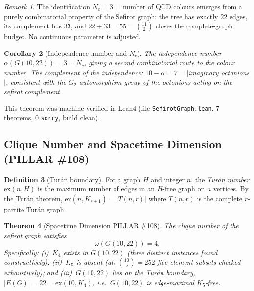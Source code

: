 \documentclass[aps,prd,twocolumn,superscriptaddress,floatfix,nofootinbib]{revtex4-2}
\newtheorem{theorem}{Theorem}
\newtheorem{corollary}[theorem]{Corollary}
\theoremstyle{definition}
\newtheorem{definition}[theorem]{Definition}
\theoremstyle{remark}
\newtheorem{remark}[theorem]{Remark}
\newcommand{\ie}{\textit{i.e.}}
\begin{document}
\begin{remark}
The identification $N_c=3$ = number of QCD colours emerges from a purely
combinatorial property of the Sefirot graph: the tree has exactly $22$ edges,
its complement has $33$, and $22+33=55=\binom{11}{2}$ closes the
complete-graph budget.  No continuous parameter is adjusted.
\end{remark}

\begin{corollary}[Independence number and $N_c$]
\label{cor:independence}
The independence number $\alpha(G(10,22))=3 = N_c$, giving a second
combinatorial route to the colour number.
The complement of the independence: $10 - \alpha = 7 = |$imaginary octonions$|$,
consistent with the $G_2$ automorphism group of the octonions acting on the
sefirot complement.
\end{corollary}

This theorem was machine-verified in Lean4 (file \texttt{SefirotGraph.lean},
7 theorems, 0 \texttt{sorry}, build clean).

\subsection{Clique Number and Spacetime Dimension (PILLAR \#108)}
\label{subsec:clique-spacetime}

\begin{definition}[Tur\'{a}n boundary]
For a graph $H$ and integer $n$, the \emph{Tur\'{a}n number} $\mathrm{ex}(n,H)$
is the maximum number of edges in an $H$-free graph on $n$ vertices.
By the Tur\'{a}n theorem, $\mathrm{ex}(n,K_{r+1}) = |T(n,r)|$ where $T(n,r)$
is the complete $r$-partite Tur\'{a}n graph.
\end{definition}

\begin{theorem}[Spacetime Dimension PILLAR \#108]
\label{thm:spacetime-dim}
The clique number of the sefirot graph satisfies
\[
    \omega(G(10,22)) = 4.
\]
Specifically: (i)~$K_4$ exists in $G(10,22)$ (three distinct instances found
constructively); (ii)~$K_5$ is absent (all $\binom{10}{5}=252$ five-element
subsets checked exhaustively); and (iii)~$G(10,22)$ lies on the Tur\'{a}n
boundary, $|E(G)| = 22 = \mathrm{ex}(10,K_4)$, \ie\ $G(10,22)$ is
edge-maximal $K_5$-free.
\end{theorem}
\end{document}
